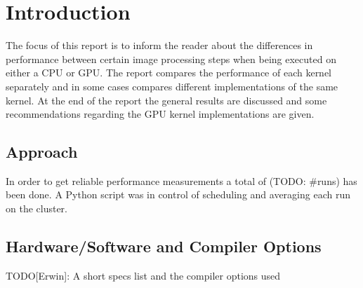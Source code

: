 \documentclass[final]{report}
\begin{document}
\chapter{Introduction}

The focus of this report is to inform the reader about the differences in performance between certain image processing steps when being executed on either a CPU or GPU.
The report compares the performance of each kernel separately and in some cases compares different implementations of the same kernel.
At the end of the report the general results are discussed and some recommendations regarding the GPU kernel implementations are given.

\section{Approach}
In order to get reliable performance measurements a total of (TODO: \#runs) has been done.
A Python script was in control of scheduling and averaging each run on the cluster.

\section{Hardware/Software and Compiler Options}
TODO[Erwin]: A short specs list and the compiler options used

\end{document}
